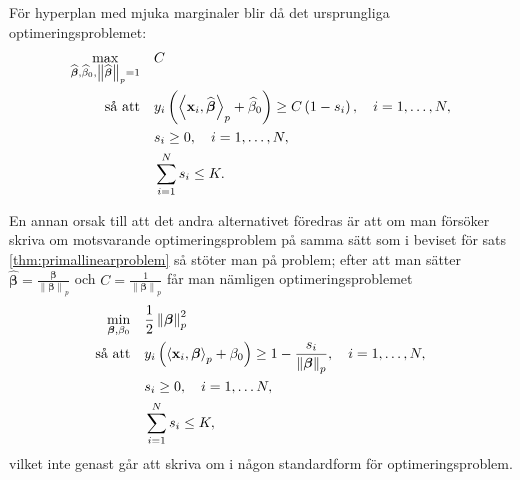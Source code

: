 \documentclass[a4paper, 12pt]{report}
\theoremstyle{definition}
\theoremstyle{remark}
\newcommand{\bfbeta}{{\boldsymbol{\beta}}}
\newcommand{\bfx}{\mathbf{x}}
\newcommand{\llangle}{\left\langle}
\newcommand{\rrangle}{\right\rangle}
\newcommand{\inner}[2]{\llangle #1, #2 \rrangle}
\begin{document}
För hyperplan med mjuka marginaler blir då det ursprungliga optimeringsproblemet:
\begin{equation}\label{opt:softmargin}
\begin{aligned}
\operatornamewithlimits{max}_{\widehat{\bfbeta},\widehat{\beta}_0,\left\|\widehat{\bfbeta}
\right\|_p=1}& & &C\\
\text{så att}& & &y_i\left(\inner{\bfx_i}{\widehat{\bfbeta}}_p+\widehat{\beta}_0\right)\geq C\left(1-s_i\right),\quad i=1,\dots,N,\\
& & &s_i\geq0,\quad i=1,\dots,N,\\
& & &\sum_{i=1}^{N}s_i \leq K.
\end{aligned}
\end{equation}

En annan orsak till att det andra alternativet föredras är att om man försöker skriva om motsvarande optimeringsproblem på samma sätt som i beviset för sats \ref{thm:primallinearproblem} så stöter man på problem; efter att man sätter $\widehat{\bfbeta}=\frac{\bfbeta}{\left\|\bfbeta
\right\|_p}$ och $C=\frac{1}{\left\|\bfbeta
\right\|_p}$ får man nämligen optimeringsproblemet
\begin{equation*}
\begin{aligned}
\operatornamewithlimits{min}_{\bfbeta,\beta_0} & & &\frac{1}{2}\left\|\bfbeta
\right\|_p^2\\
\text{så att} & & &y_i\left(\inner{\bfx_i}{\bfbeta}_p+\beta_0\right)\geq 1 - \frac{s_i}{\left\|\bfbeta
\right\|_p},\quad i=1,\dots,N,\\
& & &s_i\geq0,\quad i=1,\dots N,\\
& & &\sum_{i=1}^{N} s_i \leq K,
\end{aligned}
\end{equation*}
vilket inte genast går att skriva om i någon standardform för optimeringsproblem.
\end{document}
